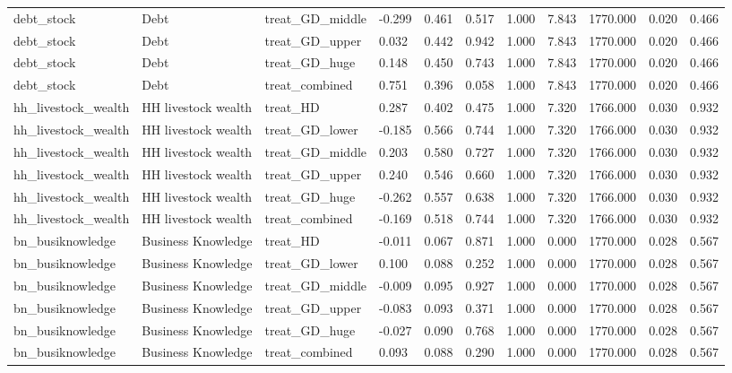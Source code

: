 \begin{tabular}{lllllllllll}
debt\_stock & Debt & treat\_GD\_middle & -0.299 & 0.461 & 0.517 & 1.000 & 7.843 & 1770.000 & 0.020 & 0.466 \\
debt\_stock & Debt & treat\_GD\_upper & 0.032 & 0.442 & 0.942 & 1.000 & 7.843 & 1770.000 & 0.020 & 0.466 \\
debt\_stock & Debt & treat\_GD\_huge & 0.148 & 0.450 & 0.743 & 1.000 & 7.843 & 1770.000 & 0.020 & 0.466 \\
debt\_stock & Debt & treat\_combined & 0.751 & 0.396 & 0.058 & 1.000 & 7.843 & 1770.000 & 0.020 & 0.466 \\
hh\_livestock\_wealth & HH livestock wealth & treat\_HD & 0.287 & 0.402 & 0.475 & 1.000 & 7.320 & 1766.000 & 0.030 & 0.932 \\
hh\_livestock\_wealth & HH livestock wealth & treat\_GD\_lower & -0.185 & 0.566 & 0.744 & 1.000 & 7.320 & 1766.000 & 0.030 & 0.932 \\
hh\_livestock\_wealth & HH livestock wealth & treat\_GD\_middle & 0.203 & 0.580 & 0.727 & 1.000 & 7.320 & 1766.000 & 0.030 & 0.932 \\
hh\_livestock\_wealth & HH livestock wealth & treat\_GD\_upper & 0.240 & 0.546 & 0.660 & 1.000 & 7.320 & 1766.000 & 0.030 & 0.932 \\
hh\_livestock\_wealth & HH livestock wealth & treat\_GD\_huge & -0.262 & 0.557 & 0.638 & 1.000 & 7.320 & 1766.000 & 0.030 & 0.932 \\
hh\_livestock\_wealth & HH livestock wealth & treat\_combined & -0.169 & 0.518 & 0.744 & 1.000 & 7.320 & 1766.000 & 0.030 & 0.932 \\
bn\_busiknowledge & Business Knowledge & treat\_HD & -0.011 & 0.067 & 0.871 & 1.000 & 0.000 & 1770.000 & 0.028 & 0.567 \\
bn\_busiknowledge & Business Knowledge & treat\_GD\_lower & 0.100 & 0.088 & 0.252 & 1.000 & 0.000 & 1770.000 & 0.028 & 0.567 \\
bn\_busiknowledge & Business Knowledge & treat\_GD\_middle & -0.009 & 0.095 & 0.927 & 1.000 & 0.000 & 1770.000 & 0.028 & 0.567 \\
bn\_busiknowledge & Business Knowledge & treat\_GD\_upper & -0.083 & 0.093 & 0.371 & 1.000 & 0.000 & 1770.000 & 0.028 & 0.567 \\
bn\_busiknowledge & Business Knowledge & treat\_GD\_huge & -0.027 & 0.090 & 0.768 & 1.000 & 0.000 & 1770.000 & 0.028 & 0.567 \\
bn\_busiknowledge & Business Knowledge & treat\_combined & 0.093 & 0.088 & 0.290 & 1.000 & 0.000 & 1770.000 & 0.028 & 0.567 \\
\bottomrule
\end{tabular}
